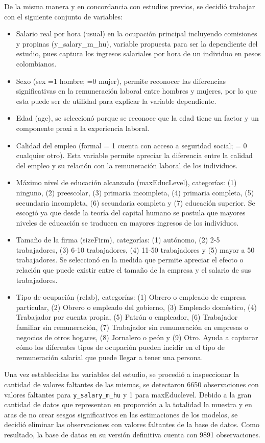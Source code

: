 \documentclass[10pt]{article}
\begin{document}
De la misma manera y en concordancia con estudios previos, se decidió trabajar con el siguiente conjunto de variables:
\begin{itemize}
\item Salario real por hora (usual) en la ocupación principal incluyendo comisiones y propinas (y\_salary\_m\_hu), variable propuesta para ser la dependiente del estudio, pues captura los ingresos salariales por hora de un individuo en pesos colombianos. 
\item Sexo (sex =1 hombre; =0 mujer), permite reconocer las diferencias significativas en la remuneración laboral entre hombres y mujeres, por lo que esta puede ser de utilidad para explicar la variable dependiente.
\item Edad (age), se seleccionó porque se reconoce que la edad tiene un factor y un componente proxi a la experiencia laboral.
\item Calidad del empleo (formal = 1 cuenta con acceso a seguridad social; = 0 cualquier otro). Esta variable permite apreciar la diferencia entre la calidad del empleo y su relación con la remuneración laboral de los individuos. 
\item Máximo nivel de educación alcanzado (maxEducLevel), categorías: (1) ninguno, (2) preescolar, (3) primaria incompleta, (4) primaria completa, (5) secundaria incompleta, (6) secundaria completa y (7) educación superior. Se escogió ya que desde la teoría del capital humano se postula que mayores niveles de educación se traducen en mayores ingresos de los individuos.
\item Tamaño de la firma (sizeFirm), categorías: (1) autónomo, (2) 2-5 trabajadores, (3) 6-10 trabajadores, (4) 11-50 trabajadores y (5) mayor a 50 trabajadores. Se seleccionó en la medida que permite apreciar el efecto o relación que puede existir entre el tamaño de la empresa y el salario de sus trabajadores.
\item Tipo de ocupación (relab), categorías: (1)	Obrero o empleado de empresa particular, (2)	Obrero o empleado del gobierno, (3)	Empleado doméstico, (4) Trabajador por cuenta propia, (5)	Patrón o empleador, (6)	Trabajador familiar sin remuneración, (7)	Trabajador sin remuneración en empresas o negocios de otros hogares, (8)	Jornalero o peón y (9) Otro. Ayuda a capturar cómo los diferentes tipos de ocupación pueden incidir en el tipo de remuneración salarial que puede llegar a tener una persona.
\end{itemize}

Una vez establecidas las variables del estudio, se procedió a inspeccionar la cantidad de valores faltantes de las mismas, se detectaron 6650 observaciones con valores faltantes para \texttt{y\_salary\_m\_hu} y 1 para maxEduclevel. Debido a la gran cantidad de datos que representan en proporción a la totalidad la muestra y en aras de no crear sesgos significativos en las estimaciones de los modelos, se decidió eliminar las observaciones con valores faltantes de la base de datos. Como resultado, la base de datos en su versión definitiva cuenta con 9891 observaciones.
\end{document}
